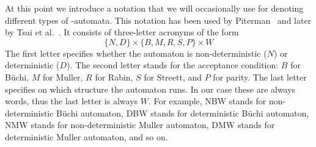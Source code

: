 At this point we introduce a notation that we will occasionally use for denoting different types of \om-automata. This notation has been used by Piterman~\cite{2006_piterman} and later by Tsai et al.~\cite{2011_tsai}. It consists of three-letter acronyms of the form
\[
\{N, D\} \times \{B, M, R, S, P\} \times W
\]
The first letter specifies whether the automaton is non-deterministic ($N$) or deterministic ($D$). The second letter stands for the acceptance condition: $B$ for Büchi, $M$ for Muller, $R$ for Rabin, $S$ for Streett, and $P$ for parity. The last letter specifies on which structure the automaton runs. In our case these are always words, thus the last letter is always $W$. For example, NBW stands for non-deterministic Büchi automaton, DBW stands for deterministic Büchi automaton, NMW stands for non-deterministic Muller automaton, DMW stands for deterministic Muller automaton, and so on.






